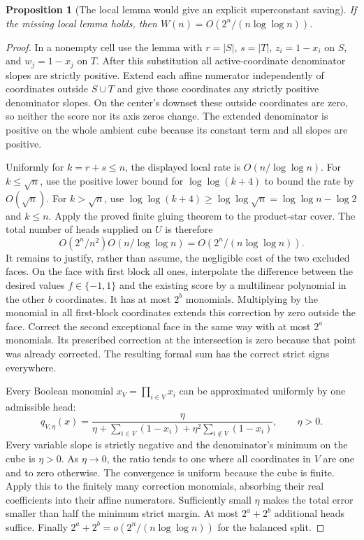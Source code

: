\documentclass[11pt]{article}
\newtheorem{proposition}{Proposition}
\begin{document}
\begin{proposition}[The local lemma would give an explicit superconstant saving]
If the missing local lemma holds, then
$W(n)=O(2^n/(n\log\log n))$.
\end{proposition}
\begin{proof}
In a nonempty cell use the lemma with $r=|S|$, $s=|T|$,
$z_i=1-x_i$ on $S$, and $w_j=1-x_j$ on $T$.
After this substitution all active-coordinate denominator slopes
are strictly positive. Extend each affine numerator independently
of coordinates outside $S\cup T$ and give those coordinates any
strictly positive denominator slopes. On the center's downset
these outside coordinates are zero, so neither the score nor its
axis zeros change. The extended denominator is positive on the
whole ambient cube because its constant term and all slopes are
positive.

Uniformly for $k=r+s\leq n$, the displayed local rate is
$O(n/\log\log n)$. For $k\leq\sqrt n$, use the positive lower
bound for $\log\log(k+4)$ to bound the rate by $O(\sqrt n)$.
For $k>\sqrt n$, use
$\log\log(k+4)\geq\log\log\sqrt n
=\log\log n-\log2$ and $k\leq n$.
Apply the proved finite gluing theorem to the product-star cover.
The total number of heads supplied on $U$ is therefore
\[
 O(2^n/n^2)O(n/\log\log n)=O(2^n/(n\log\log n)).
\]
It remains to justify, rather than assume, the negligible cost of
the two excluded faces. On the face with first block all ones,
interpolate the difference between the desired values $f\in\{-1,1\}$
and the existing score by a multilinear polynomial in the other
$b$ coordinates. It has at most $2^b$ monomials. Multiplying by
the monomial in all first-block coordinates extends this correction
by zero outside the face. Correct the second exceptional face
in the same way with at most $2^a$ monomials. Its prescribed
correction at the intersection is zero because that point was
already corrected. The resulting formal sum has the correct
strict signs everywhere.

Every Boolean monomial $x_V=\prod_{i\in V}x_i$ can be approximated
uniformly by one admissible head:
\[
 q_{V,\eta}(x)=
 \frac{\eta}{\eta+\sum_{i\in V}(1-x_i)
                 +\eta^2\sum_{i\notin V}(1-x_i)},
 \qquad\eta>0.
\]
Every variable slope is strictly negative and the denominator's
minimum on the cube is $\eta>0$. As $\eta\to0$, the ratio tends
to one where all coordinates in $V$ are one and to zero otherwise.
The convergence is uniform because the cube is finite. Apply this
to the finitely many correction monomials, absorbing their real
coefficients into their affine numerators. Sufficiently small
$\eta$ makes the total error smaller than half the minimum strict
margin. At most $2^a+2^b$ additional heads suffice.
Finally $2^a+2^b=o(2^n/(n\log\log n))$ for the balanced split.
\end{proof}
\end{document}
